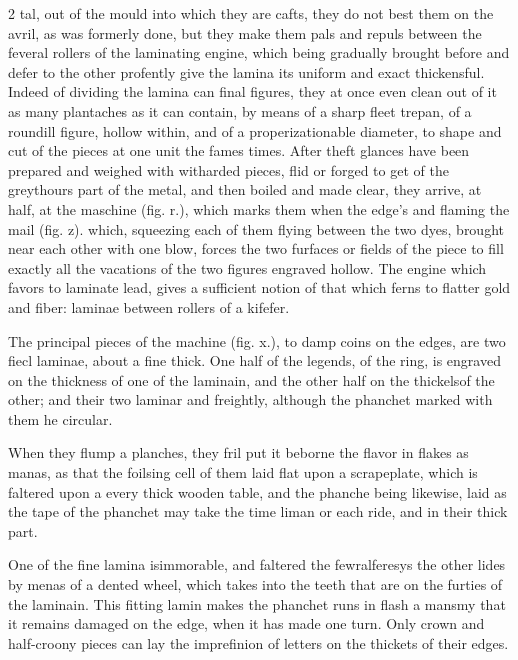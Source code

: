 \documentclass[10pt]{article}
\begin{document}
\begin{multicols}{2}
tal, out of the mould into which they are cafts, they do not best them on the avril, as was formerly done, but they make them pals and repuls between the feveral rollers of the laminating engine, which being gradually brought before and defer to the other profently give the lamina its uniform and exact thickensful. Indeed of dividing the lamina can final figures, they at once even clean out of it as many plantaches as it can contain, by means of a sharp fleet trepan, of a roundill figure, hollow within, and of a properizationable diameter, to shape and cut of the pieces at one unit the fames times. After theft glances have been prepared and weighed with witharded pieces, flid or forged to get of the greythours part of the metal, and then boiled and made clear, they arrive, at half, at the maschine (fig. r.), which marks them when the edge's and flaming the mail (fig. z). which, squeezing each of them flying between the two dyes, brought near each other with one blow, forces the two furfaces or fields of the piece to fill exactly all the vacations of the two figures engraved hollow. The engine which favors to laminate lead, gives a sufficient notion of that which ferns to flatter gold and fiber: laminae between rollers of a kifefer.

The principal pieces of the machine (fig. x.), to damp coins on the edges, are two fiecl laminae, about a fine thick. One half of the legends, of the ring, is engraved on the thickness of one of the laminain, and the other half on the thickelsof the other; and their two laminar and freightly, although the phanchet marked with them he circular.

When they flump a planches, they fril put it beborne the flavor in flakes as manas, as that the foilsing cell of them laid flat upon a scrapeplate, which is faltered upon a every thick wooden table, and the phanche being likewise, laid as the tape of the phanchet may take the time liman or each ride, and in their thick part.

One of the fine lamina isimmorable, and faltered the fewralferesys the other lides by menas of a dented wheel, which takes into the teeth that are on the furties of the laminain. This fitting lamin makes the phanchet runs in flash a mansmy that it remains damaged on the edge, when it has made one turn. Only crown and half-croony pieces can lay the imprefinion of letters on the thickets of their edges.


\end{multicols}
\end{document}
